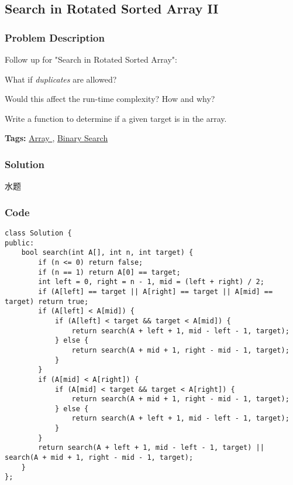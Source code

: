 \documentclass{article}
\begin{document}
\begin{CJK*}{UTF8}{gkai}
\subsection{ Search in Rotated Sorted Array II }
\label{ Search in Rotated Sorted Array II }

\subsubsection*{Problem Description}
Follow up for "Search in Rotated Sorted Array":


What if \emph{duplicates} are allowed?

Would this affect the run-time complexity? How and why?

Write a function to determine if a given target is in the array.


\textbf{Tags: }
\hyperref[ Array ]{ Array },  \hyperref[ Binary Search ]{ Binary Search }



\subsubsection*{Solution}
水题

\subsubsection*{Code}
\begin{lstlisting}
class Solution {
public:
    bool search(int A[], int n, int target) {
        if (n <= 0) return false;
        if (n == 1) return A[0] == target;
        int left = 0, right = n - 1, mid = (left + right) / 2;
        if (A[left] == target || A[right] == target || A[mid] == target) return true;
        if (A[left] < A[mid]) {
            if (A[left] < target && target < A[mid]) {
                return search(A + left + 1, mid - left - 1, target);
            } else {
                return search(A + mid + 1, right - mid - 1, target);
            }
        }
        if (A[mid] < A[right]) {
            if (A[mid] < target && target < A[right]) {
                return search(A + mid + 1, right - mid - 1, target);
            } else {
                return search(A + left + 1, mid - left - 1, target);
            }
        }
        return search(A + left + 1, mid - left - 1, target) || search(A + mid + 1, right - mid - 1, target);
    }
}; 
\end{lstlisting}



\end{CJK*}
\end{document}
